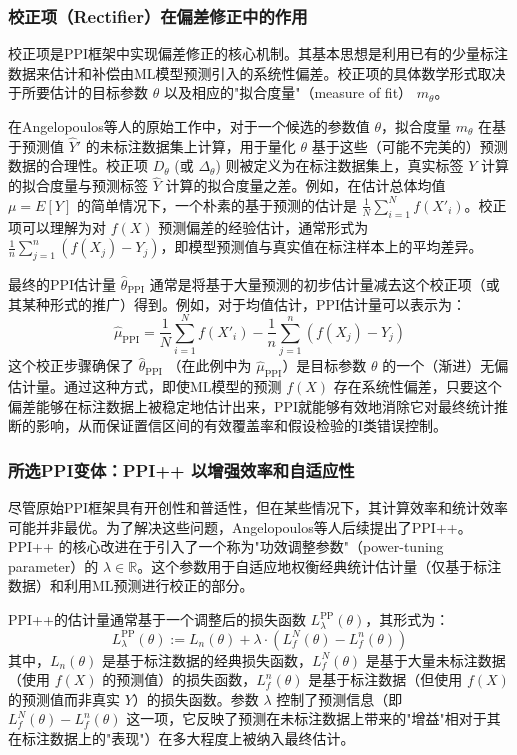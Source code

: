 \documentclass[12pt,a4paper]{article}
\begin{document}
\subsubsection{校正项（Rectifier）在偏差修正中的作用}
\label{sec:rectifier}
校正项是PPI框架中实现偏差修正的核心机制。其基本思想是利用已有的少量标注数据来估计和补偿由ML模型预测引入的系统性偏差。校正项的具体数学形式取决于所要估计的目标参数 $\theta$ 以及相应的"拟合度量"（measure of fit） $m_{\theta}$。

在Angelopoulos等人的原始工作中，对于一个候选的参数值 $\theta$，拟合度量 $m_{\theta}$ 在基于预测值 $\hat{Y}'$ 的未标注数据集上计算，用于量化 $\theta$ 基于这些（可能不完美的）预测数据的合理性。校正项 $D_{\theta}$ (或 $\Delta_{\theta}$) 则被定义为在标注数据集上，真实标签 $Y$ 计算的拟合度量与预测标签 $\hat{Y}$ 计算的拟合度量之差。例如，在估计总体均值 $\mu=E[Y]$ 的简单情况下，一个朴素的基于预测的估计是 $\frac{1}{N}\sum_{i=1}^{N}f(X'_i)$。校正项可以理解为对 $f(X)$ 预测偏差的经验估计，通常形式为 $\frac{1}{n}\sum_{j=1}^{n}(f(X_j)-Y_j)$，即模型预测值与真实值在标注样本上的平均差异。

最终的PPI估计量 $\hat{\theta}_{\text{PPI}}$ 通常是将基于大量预测的初步估计量减去这个校正项（或其某种形式的推广）得到。例如，对于均值估计，PPI估计量可以表示为：
\begin{equation}
\hat{\mu}_{\text{PPI}} = \frac{1}{N} \sum_{i=1}^{N} f(X'_i) - \frac{1}{n} \sum_{j=1}^{n} (f(X_j) - Y_j)
\label{eq:ppi_estimator_new}
\end{equation}
这个校正步骤确保了 $\hat{\theta}_{\text{PPI}}$ （在此例中为 $\hat{\mu}_{\text{PPI}}$）是目标参数 $\theta$ 的一个（渐进）无偏估计量。通过这种方式，即使ML模型的预测 $f(X)$ 存在系统性偏差，只要这个偏差能够在标注数据上被稳定地估计出来，PPI就能够有效地消除它对最终统计推断的影响，从而保证置信区间的有效覆盖率和假设检验的I类错误控制。

\subsubsection{所选PPI变体：PPI++ 以增强效率和自适应性}
\label{sec:ppi_plus_plus}
尽管原始PPI框架具有开创性和普适性，但在某些情况下，其计算效率和统计效率可能并非最优。为了解决这些问题，Angelopoulos等人后续提出了PPI++。PPI++ 的核心改进在于引入了一个称为"功效调整参数"（power-tuning parameter）的 $\lambda \in \mathbb{R}$。这个参数用于自适应地权衡经典统计估计量（仅基于标注数据）和利用ML预测进行校正的部分。

PPI++的估计量通常基于一个调整后的损失函数 $L^{\text{PP}}_{\lambda}(\theta)$，其形式为：
\begin{equation}
L^{\text{PP}}_{\lambda}(\theta) := L_n(\theta) + \lambda \cdot (L_f^N(\theta) - L_f^n(\theta))
\label{eq:ppi_plus_plus_loss}
\end{equation}
其中，$L_n(\theta)$ 是基于标注数据的经典损失函数，$L_f^N(\theta)$ 是基于大量未标注数据（使用 $f(X)$ 的预测值）的损失函数，$L_f^n(\theta)$ 是基于标注数据（但使用 $f(X)$ 的预测值而非真实 $Y$）的损失函数。参数 $\lambda$ 控制了预测信息（即 $L_f^N(\theta) - L_f^n(\theta)$ 这一项，它反映了预测在未标注数据上带来的"增益"相对于其在标注数据上的"表现"）在多大程度上被纳入最终估计。
\end{document}
